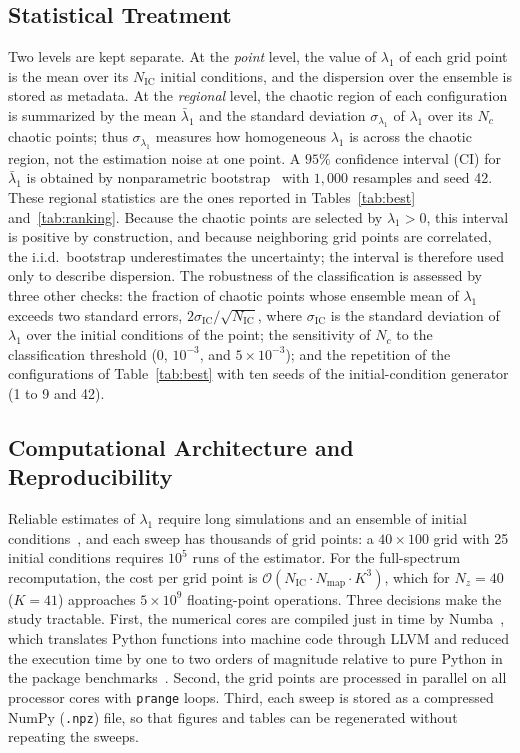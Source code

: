 \documentclass[journal]{IEEEtran}
\begin{document}
\subsection{Statistical Treatment}\label{sub:stats}
Two levels are kept separate. At the \emph{point} level, the value of
$\lambda_1$ of each grid point is the mean over its $N_{\text{IC}}$ initial
conditions, and the dispersion over the ensemble is stored as metadata. At the
\emph{regional} level, the chaotic region of each configuration is summarized
by the mean $\bar\lambda_1$ and the standard deviation $\sigma_{\lambda_1}$ of
$\lambda_1$ over its $N_c$ chaotic points; thus $\sigma_{\lambda_1}$ measures
how homogeneous $\lambda_1$ is across the chaotic region, not the estimation
noise at one point. A $95\%$ confidence interval (CI) for $\bar\lambda_1$ is
obtained by nonparametric bootstrap~\cite{EfronTibshirani1993} with $1{,}000$
resamples and seed 42. These regional statistics are the ones reported in
Tables~\ref{tab:best} and~\ref{tab:ranking}. Because the chaotic points are
selected by $\lambda_1>0$, this interval is positive by construction, and
because neighboring grid points are correlated, the i.i.d.\ bootstrap
underestimates the uncertainty; the interval is therefore used only to
describe dispersion. The robustness of the classification is assessed by
three other checks: the fraction of chaotic points whose ensemble mean of
$\lambda_1$ exceeds two standard errors, $2\sigma_{\mathrm{IC}}/\sqrt{N_{\text{IC}}}$, where $\sigma_{\mathrm{IC}}$
is the standard deviation of $\lambda_1$ over the initial conditions of the
point; the sensitivity of $N_c$ to the classification threshold ($0$,
$10^{-3}$, and $5\times10^{-3}$); and the repetition of the configurations of
Table~\ref{tab:best} with ten seeds of the initial-condition generator (1 to
9 and 42).

\subsection{Computational Architecture and Reproducibility}\label{sub:impl}
Reliable estimates of $\lambda_1$ require long simulations and an ensemble of
initial conditions~\cite{Wolf1985}, and each sweep has thousands of grid
points: a $40\times100$ grid with 25 initial conditions requires $10^5$ runs of
the estimator. For the full-spectrum recomputation, the cost per grid point is
$\mathcal{O}(N_{\text{IC}}\cdot N_{\text{map}}\cdot K^3)$, which for $N_z=40$
($K=41$) approaches $5\times10^{9}$ floating-point operations. Three decisions
make the study tractable. First, the numerical cores are compiled just in time
by Numba~\cite{Numba}, which translates Python functions into machine code
through LLVM and reduced the execution time by one to two orders of magnitude
relative to pure Python in the package benchmarks~\cite{chaoticPFC2026}.
Second, the grid points are processed in parallel on all processor cores with
\texttt{prange} loops. Third, each sweep is stored as a compressed NumPy
(\texttt{.npz}) file, so that figures and tables can be regenerated without
repeating the sweeps.
\end{document}
